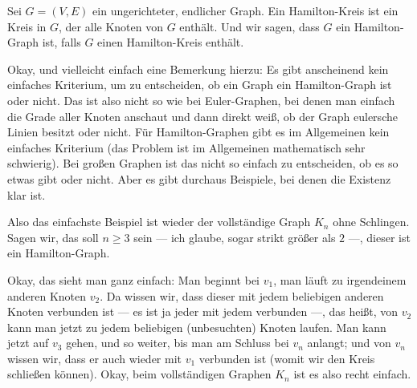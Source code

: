 \begin{spoken-clean}[00:32:29 - 00:34:16]
Sei $G = (V, E)$ ein ungerichteter, endlicher Graph. Ein Hamilton-Kreis ist ein Kreis in $G$, der alle Knoten von $G$ enthält. Und wir sagen, dass $G$ ein Hamilton-Graph ist, falls $G$ einen Hamilton-Kreis enthält.

Okay, und vielleicht einfach eine Bemerkung hierzu: Es gibt anscheinend kein einfaches Kriterium, um zu entscheiden, ob ein Graph ein Hamilton-Graph ist oder nicht. Das ist also nicht so wie bei Euler-Graphen, bei denen man einfach die Grade aller Knoten anschaut und dann direkt weiß, ob der Graph eulersche Linien besitzt oder nicht. Für Hamilton-Graphen gibt es im Allgemeinen kein einfaches Kriterium (das Problem ist im Allgemeinen mathematisch sehr schwierig). Bei großen Graphen ist das nicht so einfach zu entscheiden, ob es so etwas gibt oder nicht. Aber es gibt durchaus Beispiele, bei denen die Existenz klar ist.
\end{spoken-clean}

\begin{ai-global-state-checkpoint-invisible-content}
\end{ai-global-state-checkpoint-invisible-content}

\begin{math-stroke}
\end{math-stroke}

\begin{spoken-clean}[00:34:16 - 00:35:22]
Also das einfachste Beispiel ist wieder der vollständige Graph $K_n$ ohne Schlingen. Sagen wir, das soll $n \ge 3$ sein --- ich glaube, sogar strikt größer als $2$ ---, dieser ist ein Hamilton-Graph.

Okay, das sieht man ganz einfach: Man beginnt bei $v_1$, man läuft zu irgendeinem anderen Knoten $v_2$. Da wissen wir, dass dieser mit jedem beliebigen anderen Knoten verbunden ist --- es ist ja jeder mit jedem verbunden ---, das heißt, von $v_2$ kann man jetzt zu jedem beliebigen (unbesuchten) Knoten laufen. Man kann jetzt auf $v_3$ gehen, und so weiter, bis man am Schluss bei $v_n$ anlangt; und von $v_n$ wissen wir, dass er auch wieder mit $v_1$ verbunden ist (womit wir den Kreis schließen können). Okay, beim vollständigen Graphen $K_n$ ist es also recht einfach.
\end{spoken-clean}

